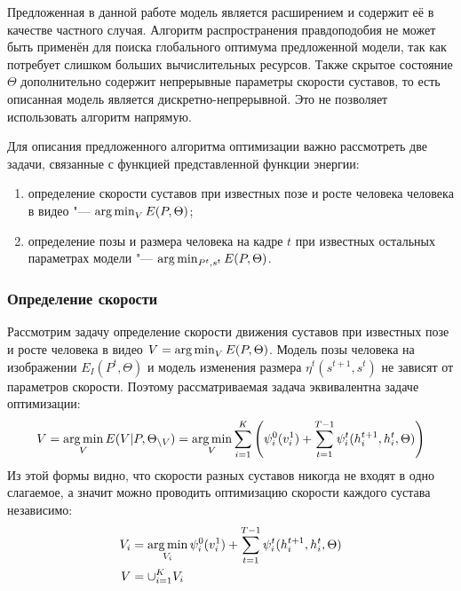 Предложенная в данной работе модель является расширением \cite{park2011n} и содержит её в качестве частного случая. Алгоритм распространения правдоподобия не может быть применён для поиска глобального оптимума предложенной модели, так как потребует слишком больших вычислительных ресурсов. Также скрытое состояние $\Theta$ дополнительно содержит непрерывные параметры скорости суставов, то есть описанная модель является дискретно-непрерывной. Это не позволяет использовать алгоритм \cite{park2011n} напрямую.

Для описания предложенного алгоритма оптимизации важно рассмотреть две задачи, связанные с функцией представленной функции энергии:
\begin{enumerate}
	\item определение скорости суставов при известных позе и росте человека человека в видео "--- $\operatorname*{arg\,min}_{V} E(P, \Theta)$;
	\item определение позы и размера человека на кадре $t$ при известных остальных параметрах модели "--- $\operatorname*{arg\,min}_{P^t, s^t} E(P, \Theta)$.
\end{enumerate}

\subsubsection{Определение скорости}

Рассмотрим задачу определение скорости движения суставов при известных позе и росте человека в видео $V = \operatorname*{arg\,min}_{V} E(P, \Theta)$. Модель позы человека на изображении $E_I(P^t, \Theta)$ и модель изменения размера $\eta^t(s^{t+1}, s^t)$ не зависят от параметров скорости. Поэтому рассматриваемая задача эквивалентна задаче оптимизации:
\begin{equation}
	V = \operatorname*{arg\,min}_V E(V|P, \Theta_{\backslash V}) = \operatorname*{arg\,min}_V {\sum_{i=1}^K\left(\psi^0_i(v^1_i) + \sum_{t=1}^{T-1}\psi_i^t(h_i^{t+1}, h_i^{t}, \Theta) \right)}
\end{equation}
Из этой формы видно, что скорости разных суставов никогда не входят в одно слагаемое, а значит можно проводить оптимизацию скорости каждого сустава независимо:
\begin{equation}
	\begin{aligned}
		V_i &= \operatorname*{arg\,min}_{V_i} \psi^0_i(v^1_i) + \sum_{t=1}^{T-1}\psi_i^t(h_i^{t+1}, h_i^{t}, \Theta) \\
		V &= \cup_{i=1}^K V_i
	\end{aligned}
\end{equation}

